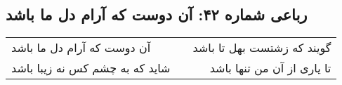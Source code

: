 \begin{center}
\section*{رباعی شماره ۴۲: آن دوست که آرام دل ما باشد}
\label{sec:042}
\begin{longtable}{l p{0.5cm} r}
آن دوست که آرام دل ما باشد
&&
گویند که زشتست بهل تا باشد
\\
شاید که به چشم کس نه زیبا باشد
&&
تا یاری از آن من تنها باشد
\\
\end{longtable}
\end{center}
